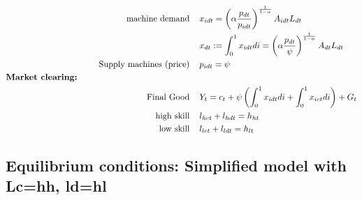 \begin{align*}
\text{machine demand}\hspace{4mm} & x_{idt} = \left(\alpha\frac{ p_{dt}}{p_{idt}}\right)^\frac{1}{1-\alpha}A_{idt}L_{dt}\\
& x_{dt}:=\int_{0}^{1}x_{idt} di= \left(\alpha\frac{p_{dt}}{\psi}\right)^\frac{1}{1-\alpha}A_{dt}L_{dt}\\
\text{Supply machines (price)}\hspace{4mm}& p_{idt}=\psi\\
\text{\textbf{Market clearing:}}\hspace{50mm}& \nonumber\\
\text{Final Good}\hspace{4mm}& Y_{t}=c_t+\psi\left(\int_{0}^1x_{idt}di+\int_{0}^1x_{ict}di\right)+G_t%
\\
\text{high skill}\hspace{4mm}& l_{hct}+l_{hdt}=h_{ht}\\
\text{low skill}\hspace{4mm}&l_{lct}+l_{ldt}=h_{lt}
\end{align*}
\subsection{Equilibrium conditions: Simplified model with Lc=hh, ld=hl}

